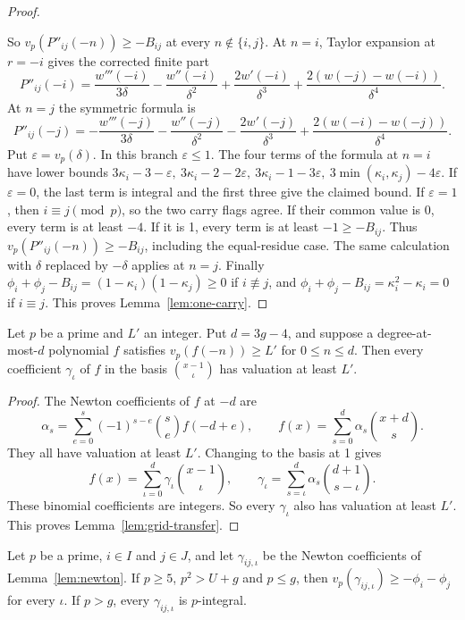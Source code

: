 \begin{proof}
\begin{enumerate}
\end{enumerate}
So \(v_p(P''_{ij}(-n))\ge-B_{ij}\) at every \(n\notin\{i,j\}\). At \(n=i\), Taylor expansion at \(r=-i\) gives the corrected finite part
\[
 P''_{ij}(-i)=\frac{w'''(-i)}{3\delta}-\frac{w''(-i)}{\delta^2}
 +\frac{2w'(-i)}{\delta^3}+\frac{2(w(-j)-w(-i))}{\delta^4}.
\]
At \(n=j\) the symmetric formula is
\[
 P''_{ij}(-j)=-\frac{w'''(-j)}{3\delta}-\frac{w''(-j)}{\delta^2}
 -\frac{2w'(-j)}{\delta^3}+\frac{2(w(-i)-w(-j))}{\delta^4}.
\]
Put \(\varepsilon=v_p(\delta)\). In this branch \(\varepsilon\le1\). The four terms of the formula at \(n=i\) have lower bounds \(3\kappa_i-3-\varepsilon,\ 3\kappa_i-2-2\varepsilon,\ 3\kappa_i-1-3\varepsilon,\ 3\min(\kappa_i,\kappa_j)-4\varepsilon\). If \(\varepsilon=0\), the last term is integral and the first three give the claimed bound. If \(\varepsilon=1\), then \(i\equiv j\pmod p\), so the two carry flags agree. If their common value is 0, every term is at least \(-4\). If it is 1, every term is at least \(-1\ge-B_{ij}\). Thus \(v_p(P''_{ij}(-n))\ge-B_{ij}\), including the equal-residue case. The same calculation with \(\delta\) replaced by \(-\delta\) applies at \(n=j\). Finally \(\phi_i+\phi_j-B_{ij}=(1-\kappa_i)(1-\kappa_j)\ge0\) if \(i\not\equiv j\), and \(\phi_i+\phi_j-B_{ij}=\kappa_i^2-\kappa_i=0\) if \(i\equiv j\). This proves Lemma~\ref{lem:one-carry}.
\end{proof}

\begin{lemma}\label{lem:grid-transfer}
Let \(p\) be a prime and \(L'\) an integer. Put \(d=3g-4\), and suppose a degree-at-most-\(d\) polynomial \(f\) satisfies \(v_p(f(-n))\ge L'\) for \(0\le n\le d\). Then every coefficient \(\gamma_\iota\) of \(f\) in the basis \(\binom{x-1}{\iota}\) has valuation at least \(L'\).
\end{lemma}

\begin{proof}
The Newton coefficients of \(f\) at \(-d\) are
\[
 \alpha_s=\sum_{e=0}^s(-1)^{s-e}\binom se f(-d+e),\qquad
 f(x)=\sum_{s=0}^d\alpha_s\binom{x+d}{s}.
\]
They all have valuation at least \(L'\). Changing to the basis at 1 gives
\[
 f(x)=\sum_{\iota=0}^d\gamma_\iota\binom{x-1}{\iota},\qquad
 \gamma_\iota=\sum_{s=\iota}^d\alpha_s\binom{d+1}{s-\iota}.
\]
These binomial coefficients are integers. So every \(\gamma_\iota\) also has valuation at least \(L'\). This proves Lemma~\ref{lem:grid-transfer}.
\end{proof}

\begin{lemma}\label{lem:poly-part}
Let \(p\) be a prime, \(i\in I\) and \(j\in J\), and let \(\gamma_{ij,\iota}\) be the Newton coefficients of Lemma~\ref{lem:newton}. If \(p\ge5\), \(p^2>U+g\) and \(p\le g\), then \(v_p(\gamma_{ij,\iota})\ge-\phi_i-\phi_j\) for every \(\iota\). If \(p>g\), every \(\gamma_{ij,\iota}\) is \(p\)-integral.
\end{lemma}


